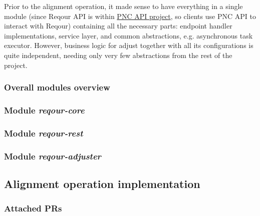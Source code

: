 \documentclass[../main.tex]{subfiles}
\begin{document}
Prior to the alignment operation, it made sense to have everything in a single module (since Reqour API is within \href{https://github.com/project-ncl/pnc-api}{PNC API project}, so clients use PNC API to interact with Reqour) containing all the necessary parts: endpoint handler implementations, service layer, and common abstractions, e.g. asynchronous task executor. However, business logic for adjust together with all its configurations is quite independent, needing only very few abstractions from the rest of the project.

\subsubsection*{Overall modules overview}


\subsubsection*{Module \textit{reqour-core}}


\subsubsection*{Module \textit{reqour-rest}}


\subsubsection*{Module \textit{reqour-adjuster}}


\subsection*{Alignment operation implementation}


\subsubsection*{Attached PRs}

\end{document}
